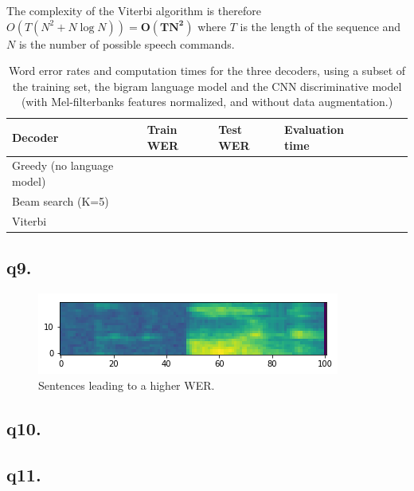 \documentclass[11pt]{article}
\begin{document}
   The complexity of the Viterbi algorithm is therefore $O(T (N^2 + N \log N)) =   \mathbf{O(T N^2)}$ where $T$ is the length of the sequence and $N$ is the number of possible speech commands.
   
   \begin{table}[h!]
\centering
  \begin{tabular}{|l|l|l|l|l|l|l|}  \hline     
   Decoder & Train WER & Test WER & Evaluation time \\  \hline    
   Greedy (no language model) &  &  &  \\ \hline
    Beam search (K=5)  & & & \\ \hline
    Viterbi  & & & \\ \hline
  \end{tabular}
  \caption{Word error rates and computation times for the three decoders, using a subset of the training set, the bigram language model and the CNN discriminative model (with Mel-filterbanks features normalized, and without data augmentation.)}
\end{table}

  \subsection*{q9.}
  
  \begin{figure}[h!]
\begin{center}
\includegraphics[scale=0.5]{i.png}
\caption{Sentences leading to a higher WER.}
\end{center}
\end{figure}

  \subsection*{q10.}
  
  \subsection*{q11.}
  
\end{document}
